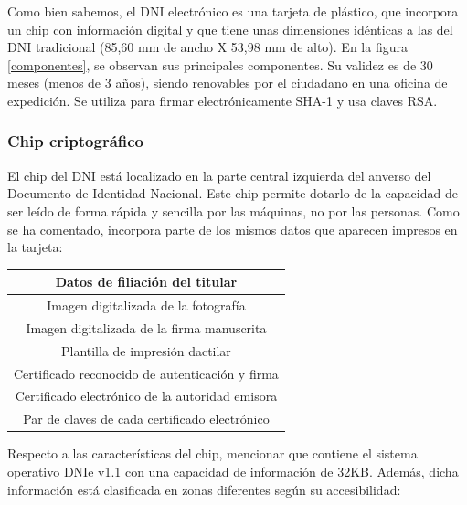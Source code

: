 \documentclass{manual}
\begin{document}
Como bien sabemos, el DNI electrónico es una tarjeta de plástico, que incorpora un chip con información digital y que tiene unas dimensiones idénticas a las del DNI tradicional (85,60 mm de ancho X 53,98 mm de alto). En la figura \ref{componentes}, se observan sus principales componentes. Su validez es de 30 meses (menos de 3 años), siendo renovables por el ciudadano en una oficina de expedición. Se utiliza para firmar electrónicamente SHA-1 y usa claves RSA. 

\subsubsection{Chip criptográfico}

El chip del DNI está localizado en la parte central izquierda del anverso del Documento de Identidad Nacional. Este chip permite dotarlo de la capacidad de ser leído de forma rápida y sencilla por las máquinas, no por las personas. Como se ha comentado, incorpora parte de los mismos datos que aparecen impresos en la tarjeta:

\begin{table}[H]
	\centering
	\begin{tabular}{|c|}
		\hline
		Datos de filiación del titular\\ \hline
		Imagen digitalizada de la fotografía\\ \hline
		Imagen digitalizada de la firma manuscrita\\ \hline
		Plantilla de impresión dactilar\\ \hline
		Certificado reconocido de autenticación y firma\\ \hline
		Certificado electrónico de la autoridad emisora\\ \hline
		Par de claves de cada certificado electrónico\\ \hline
	\end{tabular}
\end{table}

Respecto a las características del chip, mencionar que contiene el sistema operativo DNIe v1.1 con una capacidad de información de 32KB. Además, dicha información está clasificada en zonas diferentes según su accesibilidad:
\end{document}
